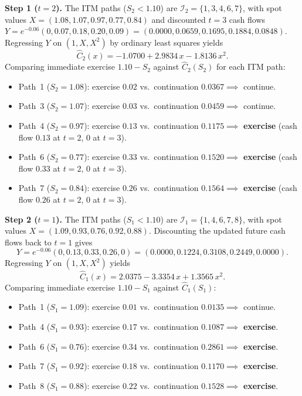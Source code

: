 \begin{example}
    \textbf{Step 1 ($t = 2$).} The ITM paths ($S_2 < 1.10$) are $\mathcal{I}_2 = \{1, 3, 4, 6, 7\}$, with spot values $X = (1.08, 1.07, 0.97, 0.77, 0.84)$ and discounted $t = 3$ cash flows $Y = e^{-0.06}(0, 0.07, 0.18, 0.20, 0.09) = (0.0000, 0.0659, 0.1695, 0.1884, 0.0848)$. Regressing $Y$ on $(1, X, X^2)$ by ordinary least squares yields
    \[
    \widehat{C}_2(x) = -1.0700 + 2.9834\,x - 1.8136\,x^2.
    \]
    Comparing immediate exercise $1.10 - S_2$ against $\widehat{C}_2(S_2)$ for each ITM path:
    \begin{itemize}
        \item Path~1 ($S_2 = 1.08$): exercise $0.02$ vs.\ continuation $0.0367 \implies$ continue.
        \item Path~3 ($S_2 = 1.07$): exercise $0.03$ vs.\ continuation $0.0459 \implies$ continue.
        \item Path~4 ($S_2 = 0.97$): exercise $0.13$ vs.\ continuation $0.1175 \implies$ \textbf{exercise} (cash flow $0.13$ at $t = 2$, $0$ at $t = 3$).
        \item Path~6 ($S_2 = 0.77$): exercise $0.33$ vs.\ continuation $0.1520 \implies$ \textbf{exercise} (cash flow $0.33$ at $t = 2$, $0$ at $t = 3$).
        \item Path~7 ($S_2 = 0.84$): exercise $0.26$ vs.\ continuation $0.1564 \implies$ \textbf{exercise} (cash flow $0.26$ at $t = 2$, $0$ at $t = 3$).
    \end{itemize}

    \textbf{Step 2 ($t = 1$).} The ITM paths ($S_1 < 1.10$) are $\mathcal{I}_1 = \{1, 4, 6, 7, 8\}$, with spot values $X = (1.09, 0.93, 0.76, 0.92, 0.88)$. Discounting the updated future cash flows back to $t = 1$ gives
    \[
    Y = e^{-0.06}(0, 0.13, 0.33, 0.26, 0) = (0.0000, 0.1224, 0.3108, 0.2449, 0.0000).
    \]
    Regressing $Y$ on $(1, X, X^2)$ yields
    \[
    \widehat{C}_1(x) = 2.0375 - 3.3354\,x + 1.3565\,x^2.
    \]
    Comparing immediate exercise $1.10 - S_1$ against $\widehat{C}_1(S_1)$:
    \begin{itemize}
        \item Path~1 ($S_1 = 1.09$): exercise $0.01$ vs.\ continuation $0.0135 \implies$ continue.
        \item Path~4 ($S_1 = 0.93$): exercise $0.17$ vs.\ continuation $0.1087 \implies$ \textbf{exercise}.
        \item Path~6 ($S_1 = 0.76$): exercise $0.34$ vs.\ continuation $0.2861 \implies$ \textbf{exercise}.
        \item Path~7 ($S_1 = 0.92$): exercise $0.18$ vs.\ continuation $0.1170 \implies$ \textbf{exercise}.
        \item Path~8 ($S_1 = 0.88$): exercise $0.22$ vs.\ continuation $0.1528 \implies$ \textbf{exercise}.
    \end{itemize}


\end{example}
